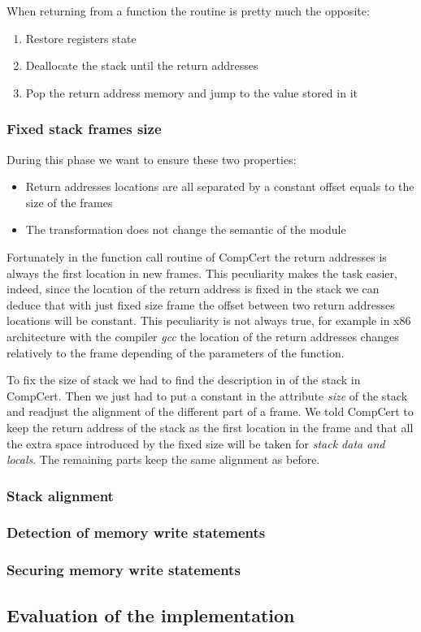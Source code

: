 \documentclass[11pt]{sdm}
\begin{document}
When returning from a function the routine is pretty much the opposite:
\begin{enumerate}
	\item Restore registers state
	\item Deallocate the stack until the return addresses
	\item Pop the return address memory and jump to the value stored in it
\end{enumerate}


\subsubsection{Fixed stack frames size}
\label{sub:Fixed stack frames size}
During this phase we want to ensure these two properties:
\begin{itemize}[noitemsep]
	\item Return addresses locations are all separated by a constant offset equals to the size of the frames
	\item The transformation does not change the semantic of the module 
\end{itemize}

Fortunately in the function call routine of CompCert the return addresses is always the first location in new frames. This peculiarity makes the task easier, indeed, since the location of the return address is fixed in the stack we can deduce that with just fixed size frame the offset between two return addresses locations will be constant.
This peculiarity is not always true, for example in x86 architecture with the compiler \textit{gcc} the location of the return addresses changes relatively to the frame depending of the parameters of the function.

To fix the size of stack we had to find the description in of the stack in CompCert. Then we just had to put a constant in the attribute \textit{size} of the stack and readjust the alignment of the different part of a frame. We told CompCert to keep the return address of the stack as the first location in the frame and that all the extra space introduced by the fixed size will be taken for  \textit{stack data and locals}. The remaining parts keep the same alignment as before.

\subsubsection{Stack alignment}
\label{ssub:Stack alignment}

\subsubsection{Detection of memory write statements}
\label{ssub:Detection of memory write statements}

\subsubsection{Securing memory write statements}
\label{ssub:Securing memory write statements}

\subsection{Evaluation of the implementation}
\label{sub:Evaluation of the implementation}
\end{document}
